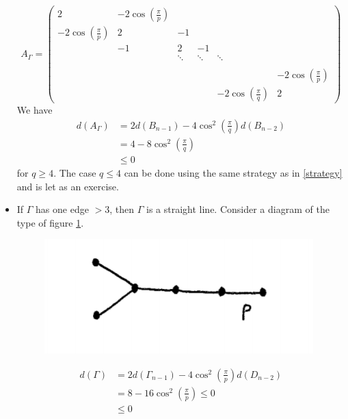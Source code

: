 \documentclass[envcountsame,envcountchap]{svmono}
\begin{document}
\begin{itemize}
\begin{equation}
A_\Gamma = \begin{pmatrix}
2 &-2 \cos \left(\frac{\pi}{p}\right) & & & &\\
-2 \cos \left(\frac{\pi}{p}\right) &2 &-1  & & &\\
 &-1 &2 &-1 & &\\
 & &\ddots &\ddots &\ddots & \\
 & & & & & \\
 & & & & &-2\cos\left(\frac{\pi}{p} \right) \\
 & & & &-2 \cos\left(\frac{\pi}{q} \right) &2 
\end{pmatrix}
\end{equation} We have
\begin{equation}
\begin{split}
d(A_\Gamma ) &= 2 d(B_{n-1} ) - 4 \cos^2 \left( \frac{\pi}{q} \right) d(B_{n-2} ) \\
&= 4 - 8 \cos^2 \left( \frac{\pi}{q} \right) \\
&\le 0 
\end{split}
\end{equation} for $q \ge 4$. The case $q\le 4$ can be done using the same strategy as in \eqref{strategy} and is let as an exercise. 

\item If $\Gamma$ has one edge $> 3$, then $\Gamma$ is a straight line. Consider a diagram of the type of figure \ref{cours9fig5}.

\begin{figure}[h!]
\centering
\includegraphics[scale=0.6]{cours9fig5.png}
\caption{}
\label{cours9fig5}
\end{figure}    

\begin{equation}
\begin{split}
d(\Gamma ) &= 2 d(\Gamma_{n-1}) - 4 \cos^2 \left( \frac{\pi}{p} \right) d (D_{n-2}) \\
&= 8 - 16 \cos^2 \left( \frac{\pi}{p} \right) \le 0 \\ 
&\le 0
\end{split}
\end{equation} 


\end{itemize}
\end{document}
